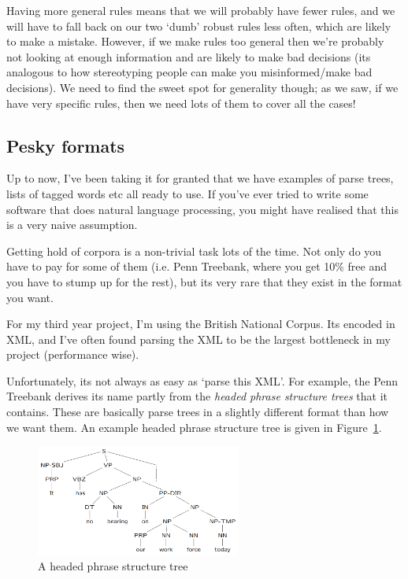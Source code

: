 Having more general rules means that we will probably have fewer rules, and we
will have to fall back on our two `dumb' robust rules less often, which are
likely to make a mistake. However, if we make rules too general then we're
probably not looking at enough information and are likely to make bad decisions
(its analogous to how stereotyping people can make you misinformed/make bad
decisions). We need to find the sweet spot for generality though; as we saw, if
we have very specific rules, then we need lots of them to cover all the cases!

\subsection{Pesky formats}

Up to now, I've been taking it for granted that we have examples of parse trees,
lists of tagged words etc all ready to use. If you've ever tried to write some
software that does natural language processing, you might have realised that
this is a very naive assumption.

Getting hold of corpora is a non-trivial task lots of the time. Not only do you
have to pay for some of them (i.e. Penn Treebank, where you get 10\% free and
you have to stump up for the rest), but its very rare that they exist in the
format you want.

For my third year project, I'm using the British National Corpus. Its encoded in
XML, and I've often found parsing the XML to be the largest bottleneck in my
project (performance wise).

Unfortunately, its not always as easy as `parse this XML'. For example, the Penn
Treebank derives its name partly from the \textit{headed phrase structure trees}
that it contains. These are basically parse trees in a slightly different format
than how we want them. An example headed phrase structure tree is given in
Figure~\ref{fig:headed-phrase-struct-tree}.

\begin{figure}[h]
  \centering
  \includegraphics[width=0.6\textwidth]{images/headed-phrase-struct}
  \caption{A headed phrase structure tree}
  \label{fig:headed-phrase-struct-tree}
\end{figure}

